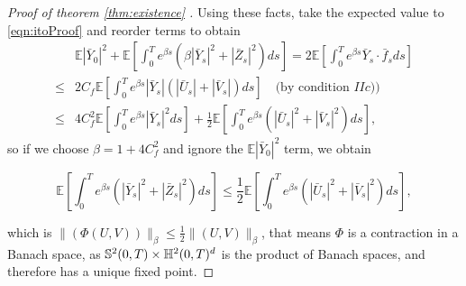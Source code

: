 \begin{proof}[Proof of theorem \ref{thm:existence} ]
Using these facts, take the expected value to \eqref{eqn:itoProof} and reorder terms to obtain 
\begin{equation}
	\begin{aligned}
		& \mathbb{E}\left|\bar{Y}_0\right|^2+\mathbb{E}\left[\int_0^T e^{\beta s}\left(\beta\left|\bar{Y}_s\right|^2+\left|\bar{Z}_s\right|^2\right) d s\right]=2 \mathbb{E}\left[\int_0^T e^{\beta s} \bar{Y}_s \cdot \bar{f}_s d s\right] \\
		\leq & 2 C_f \mathbb{E}\left[\int_0^T e^{\beta s}\left|\bar{Y}_s\right|\left(\left|\bar{U}_s\right|+\left|\bar{V}_s\right|\right) d s\right] \quad \text{(by condition $IIc$))}  \\
		\leq & 4 C_f^2 \mathbb{E}\left[\int_0^T e^{\beta s}\left|\bar{Y}_s\right|^2 d s\right]+\frac{1}{2} \mathbb{E}\left[\int_0^T e^{\beta s}\left(\left|\bar{U}_s\right|^2+\left|\bar{V}_s\right|^2\right) d s\right],
	\end{aligned}
\end{equation}
so if we choose $\beta=1+4C_f^2$ and ignore the $ \mathbb{E}\left|\bar{Y}_0\right|^2$ term, we obtain

\begin{equation}
	 \mathbb{E}\left[\int_0^T e^{\beta s}\left(\left|\bar{Y}_s\right|^2+\left|\bar{Z}_s\right|^2\right) d s\right] \leq \frac{1}{2}  \mathbb{E}\left[\int_0^T e^{\beta s}\left(\left|\bar{U}_s\right|^2+\left|\bar{V}_s\right|^2\right) d s\right],
\end{equation}

which is $\lVert(\Phi(U,V))\rVert_\beta \leq \frac{1}{2}\lVert(U,V)\rVert_\beta$, that means $\Phi$ is a contraction in a Banach space, as $\mathbb{S}^2(0,T) \times \mathbb{H}^2(0,T)^d$ is the product of Banach spaces, and therefore has a unique fixed point.
\end{proof}


